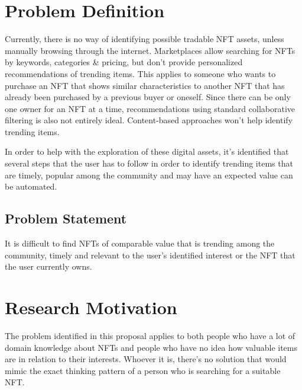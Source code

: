 \documentclass[a4paper, 12pt, oneside]{report}
\begin{document}


\chapter{Problem Definition}
Currently, there is no way of identifying possible tradable NFT assets, unless manually browsing through the internet. 
Marketplaces allow searching for NFTs by keywords, categories \& pricing, but don't provide personalized recommendations of trending items.
This applies to someone who wants to purchase an NFT that shows similar characteristics to another NFT that has already been purchased by a previous buyer or oneself. Since there can be only one owner for an NFT at a time, recommendations using standard collaborative filtering is also not entirely ideal. Content-based approaches won't help identify trending items.

\bigbreak
In order to help with the exploration of these digital assets, it's identified that several steps that the user has to follow in order to identify trending items that are timely, popular among the community and may have an expected value can be automated. 

\section{Problem Statement}
It is difficult to find NFTs of comparable value that is trending among the community, timely and relevant to the user’s identified interest or the NFT that the user currently owns.

\chapter{Research Motivation}
The problem identified in this proposal applies to both people who have a lot of domain knowledge about NFTs and people who have no idea how valuable items are in relation to their interests. Whoever it is, there's no solution that would mimic the exact thinking pattern of a person who is searching for a suitable NFT.
\end{document}
